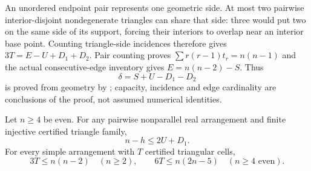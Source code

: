An unordered endpoint pair represents one geometric side. At most two
pairwise interior-disjoint nondegenerate triangles can share that side:
three would put two on the same side of its support, forcing their
interiors to overlap near an interior base point. Counting triangle-side
incidences therefore gives $3T=E-U+D_1+D_2$. Pair counting proves
$\sum r(r-1)t_r=n(n-1)$ and the actual consecutive-edge inventory gives
$E=n(n-2)-S$. Thus
\begin{equation}
 \delta=S+U-D_1-D_2
 \label{upper:actual-identity}
\end{equation}
is proved from geometry by
;
capacity, incidence and edge cardinality are conclusions of the proof,
not assumed numerical identities.

\begin{theorem}
\label{upper:actual-simple}
Let $n\ge4$ be even. For any pairwise nonparallel real arrangement and
finite injective certified triangle family,
\begin{equation}
 n-h\le2U+D_1.
 \label{upper:actual-charging}
\end{equation}
For every simple arrangement with $T$ certified triangular cells,
\begin{equation}
 3T\le n(n-2)\quad(n\ge2),\qquad
 6T\le n(2n-5)\quad(n\ge4\text{ even}).
 \label{upper:actual-simple-bounds}
\end{equation}
\end{theorem}


